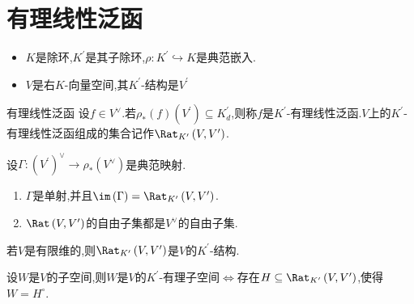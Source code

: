 \section{有理线性泛函}

\begin{itemize}
	\item $K$是除环,$K^{\prime}$是其子除环,$\rho:K^{\prime}\hookrightarrow K$是典范嵌入.
	\item $V$是右$K$-向量空间,其$K^{\prime}$-结构是$V^{\prime}$
\end{itemize}

\begin{definition}{有理线性泛函}{}
	设$f\in V^{\vee}$.若$\rho_{\ast}\left(f\right)\left(V^{\prime}\right)\subseteq K_{d}^{\prime}$,则称$f$是$K^{\prime}$-有理线性泛函.$V$上的$K^{\prime}$-有理线性泛函组成的集合记作$\Rat_{K^{\prime}}\left(V,V^{\prime}\right)$.
\end{definition}

\begin{proposition}{}{}
	设$\Gamma:\left(V^{\prime}\right)^{\vee}\to\rho_{\ast}\left(V^{\vee}\right)$是典范映射.
	\begin{enumerate}
		\item $\Gamma$是单射,并且$\im\left(\Gamma\right)=\Rat_{K^{\prime}}\left(V,V^{\prime}\right)$.
		\item $\Rat\left(V,V^{\prime}\right)$的自由子集都是$V^{\vee}$的自由子集.
	\end{enumerate}
\end{proposition}

\begin{proposition}{}{}
	若$V$是有限维的,则$\Rat_{K^{\prime}}\left(V,V^{\prime}\right)$是$V$的$K^{\prime}$-结构.
\end{proposition}

\begin{proposition}{}{}
	设$W$是$V$的子空间,则$W$是$V$的$K^{\prime}$-有理子空间$\iff$存在$H\subseteq\Rat_{K^{\prime}}\left(V,V^{\prime}\right)$,使得$W=H^{\circ}$.
\end{proposition}
